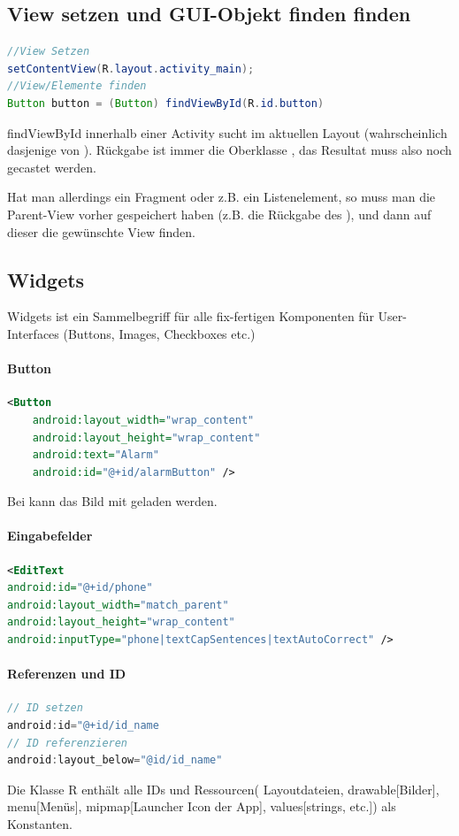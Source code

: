 \subsection{View setzen und GUI-Objekt finden finden}
\begin{lstlisting}[language=java]
//View Setzen
setContentView(R.layout.activity_main);
//View/Elemente finden
Button button = (Button) findViewById(R.id.button)
\end{lstlisting}
findViewById innerhalb einer Activity sucht im aktuellen Layout (wahrscheinlich dasjenige von ). Rückgabe ist immer die Oberklasse ,  das Resultat muss also noch gecastet werden.

Hat man allerdings ein Fragment oder z.B. ein Listenelement, so muss man die Parent-View vorher gespeichert haben (z.B. die Rückgabe des ), und dann auf dieser die gewünschte View finden. 

\subsection{Widgets}
Widgets ist ein Sammelbegriff für alle fix-fertigen Komponenten für User-Interfaces (Buttons, Images, Checkboxes etc.)

\paragraph{Button}
\begin{lstlisting}[language=xml]
<Button
    android:layout_width="wrap_content"
    android:layout_height="wrap_content"
    android:text="Alarm"
    android:id="@+id/alarmButton" />
\end{lstlisting}
Bei  kann das Bild mit  geladen werden.
\paragraph{Eingabefelder}
\begin{lstlisting}[language=xml]
<EditText
android:id="@+id/phone"
android:layout_width="match_parent"
android:layout_height="wrap_content"
android:inputType="phone|textCapSentences|textAutoCorrect" />
\end{lstlisting}
\paragraph{Referenzen und ID}
\begin{lstlisting}[language=java]
// ID setzen
android:id="@+id/id_name
// ID referenzieren 
android:layout_below="@id/id_name"
\end{lstlisting}
Die Klasse R enthält alle IDs und Ressourcen( Layoutdateien, drawable[Bilder], menu[Menüs], mipmap[Launcher Icon der App], values[strings, etc.]) als Konstanten. 
